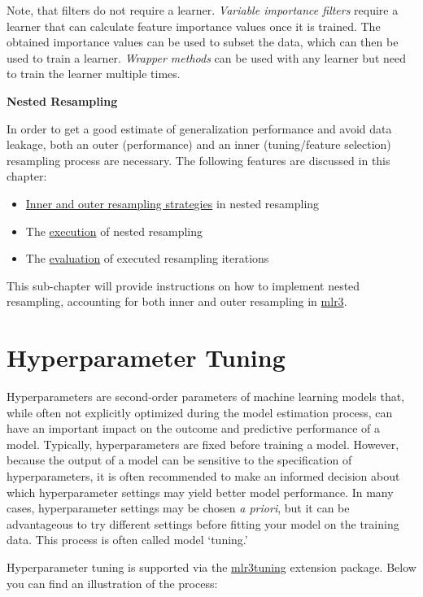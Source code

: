 \documentclass[
]{scrbook}
\providecommand{\tightlist}{%
  \setlength{\itemsep}{0pt}\setlength{\parskip}{0pt}}
\begin{document}
Note, that filters do not require a learner.
\emph{Variable importance filters} require a learner that can calculate feature importance values once it is trained.
The obtained importance values can be used to subset the data, which can then be used to train a learner.
\emph{Wrapper methods} can be used with any learner but need to train the learner multiple times.

\textbf{Nested Resampling}

In order to get a good estimate of generalization performance and avoid data leakage, both an outer (performance) and an inner (tuning/feature selection) resampling process are necessary.
The following features are discussed in this chapter:

\begin{itemize}
\tightlist
\item
  \protect\hyperlink{nested-resampling}{Inner and outer resampling strategies} in nested resampling
\item
  The \protect\hyperlink{nested-resamp-exec}{execution} of nested resampling
\item
  The \protect\hyperlink{nested-resamp-eval}{evaluation} of executed resampling iterations
\end{itemize}

This sub-chapter will provide instructions on how to implement nested resampling, accounting for both inner and outer resampling in \href{https://mlr3.mlr-org.com}{mlr3}.

\hypertarget{tuning}{%
\section{Hyperparameter Tuning}\label{tuning}}

Hyperparameters are second-order parameters of machine learning models that, while often not explicitly optimized during the model estimation process, can have an important impact on the outcome and predictive performance of a model.
Typically, hyperparameters are fixed before training a model.
However, because the output of a model can be sensitive to the specification of hyperparameters, it is often recommended to make an informed decision about which hyperparameter settings may yield better model performance.
In many cases, hyperparameter settings may be chosen \emph{a priori}, but it can be advantageous to try different settings before fitting your model on the training data.
This process is often called model `tuning.'

Hyperparameter tuning is supported via the \href{https://mlr3tuning.mlr-org.com}{mlr3tuning} extension package.
Below you can find an illustration of the process:
\end{document}

